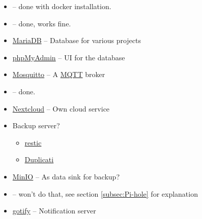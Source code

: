 \begin{figure}[H]
    \begin{itemize}
        \item {} --
              done with docker installation.
        \item {} --
              done, works fine.
        \item \href{https://mariadb.org/}{MariaDB} -- Database for various projects
        \item \href{https://www.phpmyadmin.net/}{phpMyAdmin} -- UI for the database
        \item \href{https://mosquitto.org/}{Mosquitto} -- A \href{https://mqtt.org/}{MQTT} broker
        \item {} --
              done.
        \item \href{https://nextcloud.com/}{Nextcloud} -- Own cloud service
        \item Backup server?
              \begin{itemize}
                  \item \href{https://restic.net/}{restic}
                  \item \href{https://www.duplicati.com/}{Duplicati}
              \end{itemize}
        \item \href{https://docs.min.io/}{MinIO} -- As data sink for backup?
        \item {} --
              won't do that, see section \ref{subsec:Pi-hole} for explanation
        \item \href{https://gotify.net/}{gotify} -- Notification server
    \end{itemize}
\end{figure}

